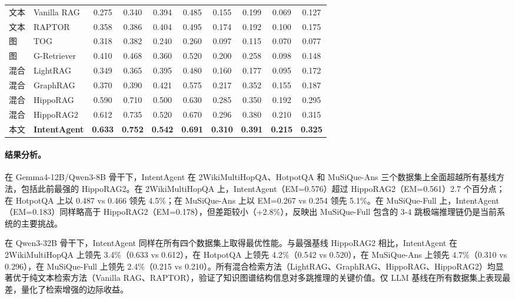 \documentclass[runningheads]{llncs}
\begin{document}
\begin{table}[htbp]
{\begin{tabular}{ll|cc|cc|cc|cc}
\midrule
文本 & Vanilla RAG & 0.275 & 0.340 & 0.394 & 0.485 & 0.155 & 0.199 & 0.069 & 0.127 \\
文本 & RAPTOR & 0.358 & 0.386 & 0.404 & 0.495 & 0.174 & 0.192 & 0.100 & 0.175 \\
\midrule
图 & TOG & 0.318 & 0.382 & 0.240 & 0.260 & 0.097 & 0.115 & 0.070 & 0.077 \\
图 & G-Retriever & 0.410 & 0.468 & 0.360 & 0.520 & 0.200 & 0.258 & 0.098 & 0.148 \\
\midrule
混合 & LightRAG & 0.349 & 0.365 & 0.395 & 0.480 & 0.160 & 0.177 & 0.095 & 0.172 \\
混合 & GraphRAG & 0.370 & 0.390 & 0.421 & 0.575 & 0.217 & 0.352 & 0.155 & 0.187 \\
混合 & HippoRAG & 0.590 & 0.710 & 0.500 & 0.630 & 0.285 & 0.350 & 0.192 & 0.295 \\
混合 & HippoRAG2 & 0.612 & 0.735 & 0.520 & 0.670 & 0.296 & 0.380 & 0.210 & 0.315 \\
\midrule
本文 & \textbf{IntentAgent} & \textbf{0.633} & \textbf{0.752} & \textbf{0.542} & \textbf{0.691} & \textbf{0.310} & \textbf{0.391} & \textbf{0.215} & \textbf{0.325} \\
\bottomrule
\end{tabular}
}
\end{table}

\paragraph{结果分析。}

在 Gemma4-12B/Qwen3-8B 骨干下，IntentAgent 在 2WikiMultiHopQA、HotpotQA 和 MuSiQue-Ans 三个数据集上全面超越所有基线方法，包括此前最强的 HippoRAG2。在 2WikiMultiHopQA 上，IntentAgent（EM=0.576）超过 HippoRAG2（EM=0.561）2.7 个百分点；在 HotpotQA 上以 0.487 vs 0.466 领先 4.5\%；在 MuSiQue-Ans 上以 EM=0.267 vs 0.254 领先 5.1\%。在 MuSiQue-Full 上，IntentAgent（EM=0.183）同样略高于 HippoRAG2（EM=0.178），但差距较小（+2.8\%），反映出 MuSiQue-Full 包含的 3-4 跳极端推理链仍是当前系统的主要挑战。

在 Qwen3-32B 骨干下，IntentAgent 同样在所有四个数据集上取得最优性能。与最强基线 HippoRAG2 相比，IntentAgent 在 2WikiMultiHopQA 上领先 3.4\%（0.633 vs 0.612），在 HotpotQA 上领先 4.2\%（0.542 vs 0.520），在 MuSiQue-Ans 上领先 4.7\%（0.310 vs 0.296），在 MuSiQue-Full 上领先 2.4\%（0.215 vs 0.210）。所有混合检索方法（LightRAG、GraphRAG、HippoRAG、HippoRAG2）均显著优于纯文本检索方法（Vanilla RAG、RAPTOR），验证了知识图谱结构信息对多跳推理的关键价值。仅 LLM 基线在所有数据集上表现最差，量化了检索增强的边际收益。
\end{document}
